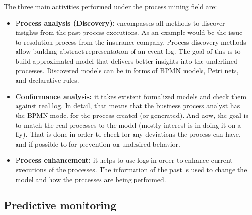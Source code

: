 The three main activities performed under the process mining field are:

\begin{itemize}
	\item \textbf{Process analysis (Discovery):} encompasses all methods to discover insights from the past process executions. As an example would be the issue to resolution process from the insurance company. Process discovery methods allow building abstract representation of an event log. The goal of this is to build approximated model that delivers better insights into the underlined processes. Discovered models can be in forms of BPMN models, Petri nets, and declarative rules. 
	\item \textbf{Conformance analysis:} it takes existent formalized models and check them against real log. In detail, that means that the business process analyst has the BPMN model for the process created (or generated). And now, the goal is to match the real processes to the model (mostly interest is in doing it on a fly). That is done in order to check for any deviations the process can have, and if possible to for prevention on undesired behavior.
	\item \textbf{Process enhancement:} it helps to use logs in order to enhance current executions of the processes. The information of the past is used to change the model and how the processes are being performed.
\end{itemize}
 


\subsection{Predictive monitoring}

